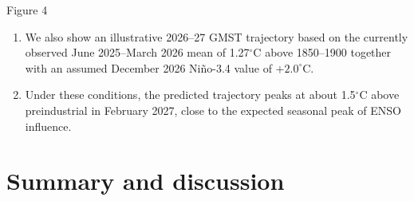 \documentclass[aspectratio=169,xcolor=dvipsnames]{beamer}
\begin{document}
\begin{frame}{Figure 4}
\begin{enumerate}
\item We also show an illustrative 2026--27 GMST trajectory based
  on the currently observed June 2025--March 2026 mean of
  1.27$^\circ$C above 1850--1900 together with an assumed
  December 2026 Ni\~no-3.4 value of $+2.0^\circ$C.

\item Under these conditions, the predicted trajectory peaks at about
  1.5$^\circ$C above preindustrial in February 2027, close to the
  expected seasonal peak of ENSO influence.
\end{enumerate}
\end{frame}


\section{Summary and discussion}\label{sec:summary}
\end{document}
